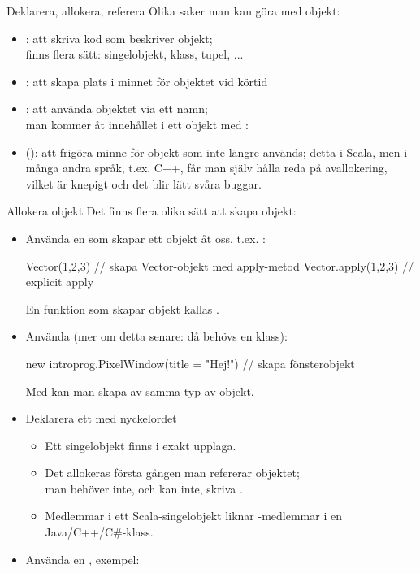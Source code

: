 \begin{Slide}{Deklarera, allokera, referera}
Olika saker man kan göra med objekt:
\begin{itemize}
  \item {}: att skriva kod som beskriver objekt; \\
  finns flera sätt: singelobjekt, klass, tupel, ...
  \item {}: att skapa plats i minnet för objektet vid körtid
  \item {}: att använda objektet via ett namn;\\
  man kommer åt innehållet i ett objekt med : \\
  \pause
  \item (): att frigöra minne för objekt som inte längre används;
  detta  i Scala, men i många andra språk,
  t.ex. C++, får man själv hålla reda på avallokering,
  vilket är knepigt och det blir lätt svåra buggar.
\end{itemize}
\end{Slide}


\begin{Slide}{Allokera objekt}\SlideFontSmall
Det finns flera olika sätt att skapa objekt:
\begin{itemize}

\item Använda en  som skapar ett objekt åt oss, t.ex. :
\begin{Code}
Vector(1,2,3)  // skapa Vector-objekt med apply-metod
Vector.apply(1,2,3)  // explicit apply
\end{Code}
{\SlideFontTiny En funktion som skapar objekt kallas  .\vspace{0.5em}}

\item Använda  (mer om detta senare: då behövs en klass):
\begin{Code}
new introprog.PixelWindow(title = "Hej!") // skapa fönsterobjekt
\end{Code}
{\SlideFontSmall Med  kan man skapa  av samma typ av objekt.\vspace{0.5em}}

\item Deklarera ett  med nyckelordet 
\begin{itemize}\SlideFontSmall
  \item Ett singelobjekt finns i exakt  upplaga.
  \item Det allokeras  första gången man refererar objektet; \\
  man behöver inte, och kan inte, skriva .
  \pause
  \item Medlemmar i ett Scala-singelobjekt liknar -medlemmar i en Java/C++/C\#-klass.
\end{itemize}
\item Använda en , exempel: 
\end{itemize}
\end{Slide}

